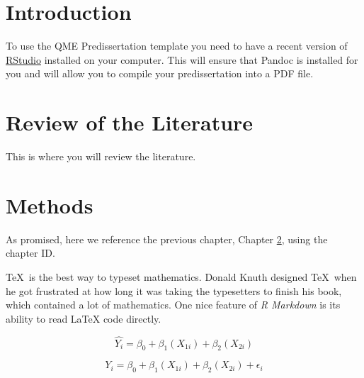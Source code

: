 \documentclass[12pt,letterpaper,oneside,oldfontcommands]{memoir}
\theoremstyle{definition}
\theoremstyle{definition}
\theoremstyle{definition}
\theoremstyle{remark}
\begin{document}
\clearpage
\pagestyle{ruled}

\tableofcontents*
\clearpage

\listoftables
\clearpage

\listoffigures
\clearpage





\mainmatter

\SingleSpacing

\hypertarget{intro}{%
\chapter{Introduction}\label{intro}}

To use the QME Predissertation template you need to have a recent
version of
\href{http://www.rstudio.com/products/rstudio/download/}{RStudio}
installed on your computer. This will ensure that Pandoc is installed
for you and will allow you to compile your predissertation into a PDF
file.

\clearpage

\hypertarget{review}{%
\chapter{Review of the Literature}\label{review}}

This is where you will review the literature.

\clearpage

\hypertarget{methods}{%
\chapter{Methods}\label{methods}}

As promised, here we reference the previous chapter, Chapter
\ref{review}, using the chapter ID.

\TeX~is the best way to typeset mathematics. Donald Knuth designed
\TeX~when he got frustrated at how long it was taking the typesetters to
finish his book, which contained a lot of mathematics. One nice feature
of \emph{R Markdown} is its ability to read LaTeX code directly.

\[
\hat{Y_i} = \beta_0 + \beta_1(X_{1i}) + \beta_2(X_{2i})
\]

\begin{equation}
Y_i = \beta_0 + \beta_1(X_{1i}) + \beta_2(X_{2i}) + \epsilon_i
\end{equation}
\end{document}
